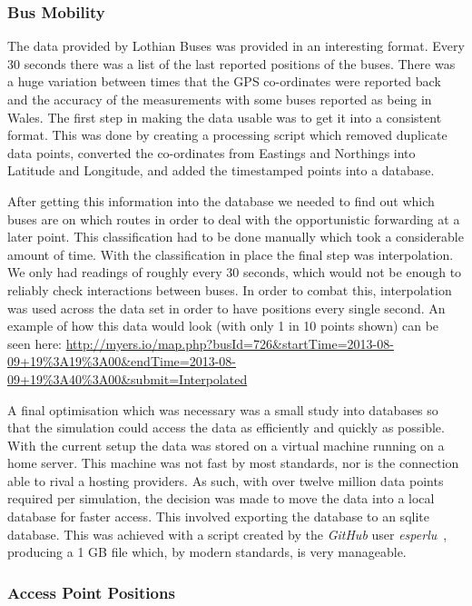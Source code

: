 \documentclass[12pt,a4paper,notitlepage]{article}
\begin{document}
\subsubsection{Bus Mobility}

The data provided by Lothian Buses was provided in an interesting format. Every 30 seconds there was a list of the last reported positions of the buses. There was a huge variation between times that the GPS co-ordinates were reported back and the accuracy of the measurements with some buses reported as being in Wales. The first step in making the data usable was to get it into a consistent format. This was done by creating a processing script which removed duplicate data points, converted the co-ordinates from Eastings and Northings into Latitude and Longitude, and added the timestamped points into a database. 

After getting this information into the database we needed to find out which buses are on which routes in order to deal with the opportunistic forwarding at a later point. This classification had to be done manually which took a considerable amount of time. With the classification in place the final step was interpolation. We only had readings of roughly every 30 seconds, which would not be enough to reliably check interactions between buses. In order to combat this, interpolation was used across the data set in order to have positions every single second. An example of how this data would look (with only 1 in 10 points shown) can be seen here: \url{http://myers.io/map.php?busId=726&startTime=2013-08-09+19%3A19%3A00&endTime=2013-08-09+19%3A40%3A00&submit=Interpolated}

A final optimisation which was necessary was a small study into databases so that the simulation could access the data as efficiently and quickly as possible. With the current setup the data was stored on a virtual machine running on a home server. This machine was not fast by most standards, nor is the connection able to rival a hosting providers. As such, with over twelve million data points required per simulation, the decision was made to move the data into a local database for faster access. This involved exporting the database to an sqlite database. This was achieved with a script created by the \emph{GitHub} user \emph{esperlu}~\cite{mysql2sqlite}, producing a 1 GB file which, by modern standards, is very manageable. 

\subsubsection{Access Point Positions}
\end{document}
